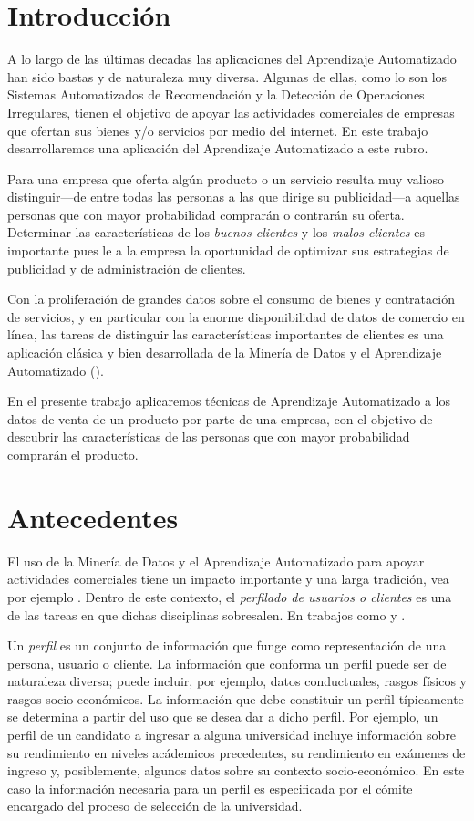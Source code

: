 \documentclass[letterpaper,11pt]{article}
\begin{document}
\begin{multicols}{2}
\section{Introducción}
A lo largo de las últimas decadas las aplicaciones del Aprendizaje Automatizado han sido bastas y de
naturaleza muy diversa. Algunas de ellas, como lo son los Sistemas Automatizados de Recomendación y la Detección de
Operaciones Irregulares, tienen el objetivo de apoyar las actividades comerciales de empresas que ofertan
sus bienes y/o servicios por medio del internet. En este trabajo desarrollaremos una aplicación del Aprendizaje
Automatizado a este rubro.

Para una empresa que oferta algún producto o un servicio resulta muy valioso distinguir---de entre todas
las personas a las que dirige su publicidad---a aquellas personas que con mayor probabilidad comprarán o
contrarán su oferta. Determinar las características de los \emph{buenos clientes} y los \emph{malos clientes} es importante pues 
le a la empresa la oportunidad de optimizar sus estrategias de publicidad y de administración de clientes. 

Con la proliferación de grandes datos sobre el consumo de bienes y contratación de servicios, y en particular con la enorme
disponibilidad de datos de comercio en línea, las tareas de distinguir las características importantes de clientes es
una aplicación clásica y bien desarrollada de la Minería de Datos y el Aprendizaje Automatizado (\cite[Capítulo I]{berry}).  

En el presente trabajo aplicaremos técnicas de Aprendizaje Automatizado a los datos de venta de un producto por parte de una empresa, 
con el objetivo de descubrir las características de las personas que con mayor probabilidad comprarán el producto. 


\section{Antecedentes}
El uso de la Minería de Datos y el Aprendizaje Automatizado para apoyar actividades comerciales tiene un impacto
importante y una larga tradición, vea por ejemplo \cite{berry}\cite{big}\cite{tdk}.  Dentro de este contexto, el 
\emph{perfilado de usuarios o clientes} es una de las tareas en que dichas disciplinas sobresalen. En trabajos como
\cite{faw} y \cite{discov}.  

Un \emph{perfil} es un conjunto de información que funge como representación de una persona, usuario o cliente\cite{cufo}. La información que
conforma un perfil puede ser de naturaleza diversa; puede incluir, por ejemplo, datos conductuales, rasgos físicos y rasgos
socio-económicos. La información que debe constituir un perfil típicamente se determina a partir del uso que
se desea dar a dicho perfil. Por ejemplo, un perfil de un candidato a ingresar a alguna universidad
incluye información sobre su rendimiento en niveles acádemicos precedentes, su rendimiento en exámenes de ingreso y, 
posiblemente, algunos datos sobre su contexto socio-económico. En este caso la información necesaria para un perfil es
especificada por el cómite encargado del proceso de selección de la universidad. 


\end{multicols}
\end{document}
